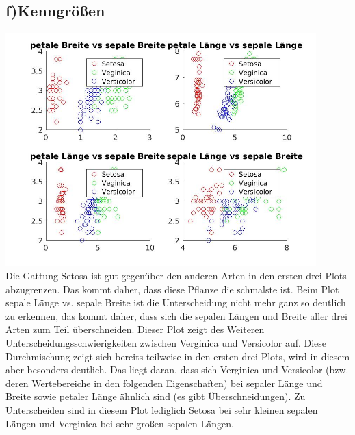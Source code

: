 \documentclass{scrartcl}
\begin{document}
\subsection*{f)Kenngrößen}
\includegraphics[width=0.9\textwidth]{plots/plotF.jpg} \\ 

Die Gattung Setosa ist gut gegenüber den anderen Arten in den ersten drei Plots abzugrenzen.
Das kommt daher, dass diese Pflanze die schmalste ist. 
Beim Plot sepale Länge vs. sepale Breite ist die Unterscheidung nicht mehr ganz so deutlich zu erkennen, das kommt daher, dass sich die sepalen Längen und Breite aller drei Arten zum Teil überschneiden.
Dieser Plot zeigt des Weiteren Unterscheidungsschwierigkeiten zwischen Verginica und Versicolor auf. 
Diese Durchmischung zeigt sich bereits teilweise in den ersten drei Plots, wird in diesem aber besonders deutlich. 
Das liegt daran, dass sich Verginica und Versicolor (bzw. deren Wertebereiche in den folgenden Eigenschaften) bei sepaler Länge und Breite sowie petaler Länge ähnlich sind (es gibt Überschneidungen). Zu Unterscheiden sind in diesem Plot lediglich Setosa bei sehr kleinen sepalen Längen und Verginica bei sehr großen sepalen Längen.


\end{document}
